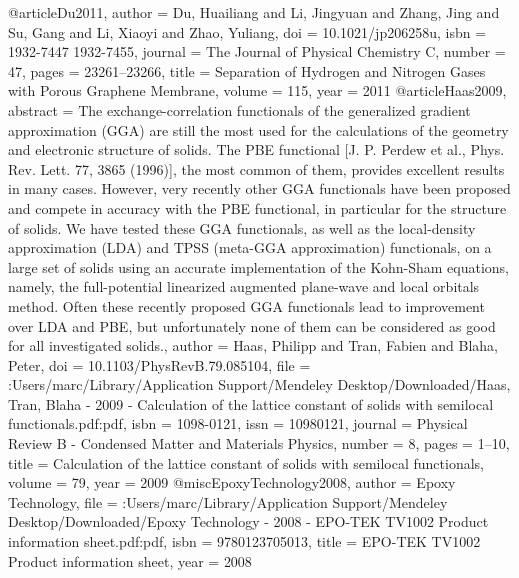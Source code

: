 @article{Du2011,
author = {Du, Huailiang and Li, Jingyuan and Zhang, Jing and Su, Gang and Li, Xiaoyi and Zhao, Yuliang},
doi = {10.1021/jp206258u},
isbn = {1932-7447
1932-7455},
journal = {The Journal of Physical Chemistry C},
number = {47},
pages = {23261--23266},
title = {{Separation of Hydrogen and Nitrogen Gases with Porous Graphene Membrane}},
volume = {115},
year = {2011}
}
@article{Haas2009,
abstract = {The exchange-correlation functionals of the generalized gradient approximation (GGA) are still the most used for the calculations of the geometry and electronic structure of solids. The PBE functional [J. P. Perdew et al., Phys. Rev. Lett. 77, 3865 (1996)], the most common of them, provides excellent results in many cases. However, very recently other GGA functionals have been proposed and compete in accuracy with the PBE functional, in particular for the structure of solids. We have tested these GGA functionals, as well as the local-density approximation (LDA) and TPSS (meta-GGA approximation) functionals, on a large set of solids using an accurate implementation of the Kohn-Sham equations, namely, the full-potential linearized augmented plane-wave and local orbitals method. Often these recently proposed GGA functionals lead to improvement over LDA and PBE, but unfortunately none of them can be considered as good for all investigated solids.},
author = {Haas, Philipp and Tran, Fabien and Blaha, Peter},
doi = {10.1103/PhysRevB.79.085104},
file = {:Users/marc/Library/Application Support/Mendeley Desktop/Downloaded/Haas, Tran, Blaha - 2009 - Calculation of the lattice constant of solids with semilocal functionals.pdf:pdf},
isbn = {1098-0121},
issn = {10980121},
journal = {Physical Review B - Condensed Matter and Materials Physics},
number = {8},
pages = {1--10},
title = {{Calculation of the lattice constant of solids with semilocal functionals}},
volume = {79},
year = {2009}
}
@misc{EpoxyTechnology2008,
author = {{Epoxy Technology}},
file = {:Users/marc/Library/Application Support/Mendeley Desktop/Downloaded/Epoxy Technology - 2008 - EPO-TEK TV1002 Product information sheet.pdf:pdf},
isbn = {9780123705013},
title = {{EPO-TEK TV1002 Product information sheet}},
year = {2008}
}
